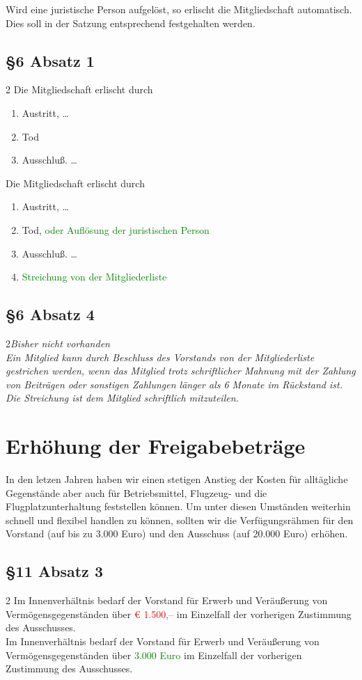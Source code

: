 \documentclass[10pt,a4paper,parskip=half]{scrartcl}
\newcommand{\new}[1]{\textcolor{Green}{#1}}
\newcommand{\old}[1]{\textcolor{Red}{#1}}
\newcommand{\compare}[3]{\subsection*{#1}\begin{multicols}{2}#2\columnbreak\\#3\end{multicols}}
\begin{document}
  Wird eine juristische Person aufgelöst, so erlischt die Mitgliedschaft automatisch. Dies soll in der Satzung entsprechend festgehalten werden.

  \subsection*{§6 Absatz 1}
  \begin{multicols}{2}
  Die Mitgliedschaft erlischt durch
  \begin{enumerate}[label=\alph*)]
    \item Austritt, \dots
    \item Tod
    \item{Ausschluß.} \dots
  \end{enumerate}
  \columnbreak
  Die Mitgliedschaft erlischt durch
  \begin{enumerate}[label=\alph*)]
    \item Austritt, \dots
    \item Tod, \new{oder Auflösung der juristischen Person}
    \item{Ausschluß.} \dots
    \item \new{Streichung von der Mitgliederliste}
  \end{enumerate}
\end{multicols}

\compare{§6 Absatz 4}{\em Bisher nicht vorhanden \em}{Ein Mitglied kann durch Beschluss des Vorstands von der Mitgliederliste gestrichen werden,
wenn das Mitglied trotz schriftlicher Mahnung mit der Zahlung von Beiträgen oder sonstigen Zahlungen länger als 6 Monate im Rückstand ist.
Die Streichung ist dem Mitglied schriftlich mitzuteilen.}


  \section{Erhöhung der Freigabebeträge}
  In den letzen Jahren haben wir einen stetigen Anstieg der Kosten für alltägliche Gegenstände aber auch für Betriebsmittel, Flugzeug- und die Flugplatzunterhaltung feststellen können. Um unter diesen Umständen weiterhin schnell und flexibel handlen zu können, sollten wir die Verfügungsrähmen für den Vorstand (auf bis zu 3.000 Euro) und den Ausschuss (auf 20.000 Euro) erhöhen. 

  \compare{§11 Absatz 3}{
    Im Innenverhältnis bedarf der Vorstand für Erwerb und Veräußerung von Vermögensgegenständen über \old{€ 1.500,--} im Einzelfall der vorherigen Zustimmung des Ausschusses.
  }{Im Innenverhältnis bedarf der Vorstand für Erwerb und Veräußerung von Vermögensgegenständen über \new{3.000 Euro} im Einzelfall der vorherigen Zustimmung des Ausschusses.}
\end{document}
